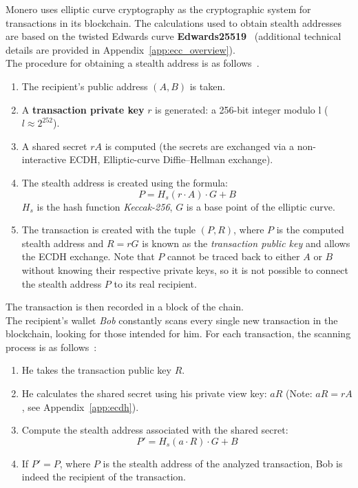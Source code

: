 \documentclass[conference]{IEEEtran}
\begin{document}
Monero uses elliptic curve cryptography as the cryptographic system for transactions in its blockchain. The calculations used to obtain stealth addresses are based on the twisted Edwards curve \textbf{Edwards25519}~\cite{monero_ed25519} (additional technical details are provided in Appendix~\ref{app:ecc_overview}).\\
The procedure for obtaining a stealth address is as follows~\cite{cryptonote, zero_to_monero_2}.
\begin{enumerate}
\item The recipient's public address $(A, B)$ is taken.
\item A \textbf{transaction private key} $r$ is generated: a 256-bit integer modulo l ($l \approx 2^{252}$).
\item A shared secret $rA$ is computed (the secrets are exchanged via a non-interactive ECDH, Elliptic-curve Diffie–Hellman exchange).
\item The stealth address is created using the formula:
\[
P = H_s(r \cdot A) \cdot G + B
\]
$H_s$ is the hash function \textit{Keccak-256}, $G$ is a base point of the elliptic curve.
\item The transaction is created with the tuple $(P, R)$, where $P$ is the computed stealth address and $R = rG$ is known as the \textit{transaction public key} \cite{zero_to_monero_2} and allows the ECDH exchange. Note that $P$ cannot be traced back to either $A$ or $B$ without knowing their respective private keys, so it is not possible to connect the stealth address $P$ to its real recipient.
\end{enumerate}
The transaction is then recorded in a block of the chain.\\

The recipient's wallet \textit{Bob} constantly scans every single new transaction in the blockchain, looking for those intended for him. For each transaction, the scanning process is as follows~\cite{zero_to_monero_2}:
\begin{enumerate}
\item He takes the transaction public key $R$.
\item He calculates the shared secret using his private view key: $aR$ (Note: $aR = rA$, see Appendix~\ref{app:ecdh}).
\item Compute the stealth address associated with the shared secret:
\[
P' = H_s(a \cdot R) \cdot G + B
\]
\item If $P' = P$, where $P$ is the stealth address of the analyzed transaction, Bob is indeed the recipient of the transaction.
\end{enumerate}
\end{document}
